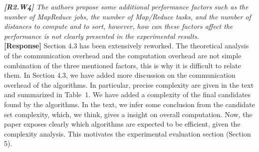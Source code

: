 \documentclass[11pt]{letter}
\newcommand{\vs}{\vspace{1ex}}
\newcommand{\TODO}[1]{\textcolor{red}{\textbf{[TODO:#1]}}}
\begin{document}
\vs
\noindent
{\em
{\bf [R2.W4]}
The authors propose some additional performance factors such as the
number of MapReduce jobs, the number of Map/Reduce tasks,
and the number of distances to compute and to sort, however, how can
these factors affect the performance is not clearly presented in the experimental results.}\\
\textbf{[Response]} 
Section 4.3 has been extensively reworked. The theoretical analysis of the communication overhead and the computation 
overhead are not simple combination of the three mentioned factors, this is why it is difficult to relate them. In 
Section 4.3, we have added more discussion on the communication overhead of the algorithms. In particular, precise 
complexity are given in the text and summarized in Table~1. We have added a complexity of the final 
candidates found by the algorithms. In the text, we infer some conclusion from the candidate set complexity, 
which, we think, gives a insight on overall computation. Now, the paper exposes clearly 
which algorithms are expected to be efficient, given the complexity analysis. This motivates the  
experimental evaluation section (Section 5).


%
\end{document}
